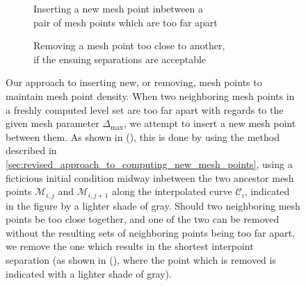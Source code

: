 \begin{figure}[htpb]
    \centering
    \begin{subfigure}[b]{0.475\textwidth}
        \centering
        \resizebox{0.9\linewidth}{!}{}
        \caption[]{{\small Inserting a new mesh point inbetween a \\\phantom{(a)} pair of mesh points which are too far apart}}
        \label{fig:mesh_management_pure_insertion}
    \end{subfigure}
    \begin{subfigure}[b]{0.475\textwidth}
        \centering
        \resizebox{0.9\linewidth}{!}{}
        \caption[]{{\small Removing a mesh point too close to another,\\\phantom{(b)} if the ensuing separations are acceptable}}
        \label{fig:mesh_management_pure_deletion}
    \end{subfigure}
    \caption[Our approach to inserting new, or removing, mesh points to maintain
    mesh point density]
    {Our approach to inserting new, or removing, mesh points to maintain
        mesh point density. When two neighboring mesh points in a freshly
        computed level set are too far apart with regards to the given mesh
        parameter $\Delta_{\max}$, we attempt to insert a new mesh point
        between them. As shown in
        (), this is done by using
        the method described in
        \cref{sec:revised_approach_to_computing_new_mesh_points}, using a
        ficticious initial condition midway inbetween the two ancestor mesh
        points $\mathcal{M}_{i,j}$ and $\mathcal{M}_{i,j+1}$ along the
        interpolated curve $\mathcal{C}_{i}$, indicated in the figure by
        a lighter shade of gray. Should two neighboring mesh points
        be too close together, and one of the two can be removed without the
        resulting sets of neighboring points being too far apart, we remove
        the one which results in the shortest interpoint separation (as shown
        in (), where the point
        which is removed is indicated with a lighter shade of gray).
    }
    \label{fig:mesh_management_insertion_and_deletion}
\end{figure}
